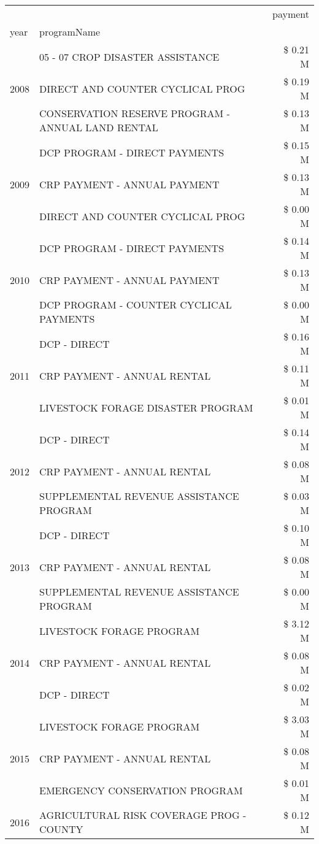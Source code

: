 \begin{tabular}{llr}
\toprule
 &  & payment \\
year & programName &  \\
\midrule
\multirow[t]{3}{*}{2008} & 05 - 07 CROP DISASTER ASSISTANCE & \$ 0.21 M \\
 & DIRECT AND COUNTER CYCLICAL PROG & \$ 0.19 M \\
 & CONSERVATION RESERVE PROGRAM - ANNUAL LAND RENTAL & \$ 0.13 M \\
\cline{1-3}
\multirow[t]{3}{*}{2009} & DCP PROGRAM - DIRECT PAYMENTS & \$ 0.15 M \\
 & CRP PAYMENT - ANNUAL PAYMENT & \$ 0.13 M \\
 & DIRECT AND COUNTER CYCLICAL PROG & \$ 0.00 M \\
\cline{1-3}
\multirow[t]{3}{*}{2010} & DCP PROGRAM - DIRECT PAYMENTS & \$ 0.14 M \\
 & CRP PAYMENT - ANNUAL PAYMENT & \$ 0.13 M \\
 & DCP PROGRAM - COUNTER CYCLICAL PAYMENTS & \$ 0.00 M \\
\cline{1-3}
\multirow[t]{3}{*}{2011} & DCP - DIRECT & \$ 0.16 M \\
 & CRP PAYMENT - ANNUAL RENTAL & \$ 0.11 M \\
 & LIVESTOCK FORAGE DISASTER PROGRAM & \$ 0.01 M \\
\cline{1-3}
\multirow[t]{3}{*}{2012} & DCP - DIRECT & \$ 0.14 M \\
 & CRP PAYMENT - ANNUAL RENTAL & \$ 0.08 M \\
 & SUPPLEMENTAL REVENUE ASSISTANCE PROGRAM & \$ 0.03 M \\
\cline{1-3}
\multirow[t]{3}{*}{2013} & DCP - DIRECT & \$ 0.10 M \\
 & CRP PAYMENT - ANNUAL RENTAL & \$ 0.08 M \\
 & SUPPLEMENTAL REVENUE ASSISTANCE PROGRAM & \$ 0.00 M \\
\cline{1-3}
\multirow[t]{3}{*}{2014} & LIVESTOCK FORAGE PROGRAM & \$ 3.12 M \\
 & CRP PAYMENT - ANNUAL RENTAL & \$ 0.08 M \\
 & DCP - DIRECT & \$ 0.02 M \\
\cline{1-3}
\multirow[t]{3}{*}{2015} & LIVESTOCK FORAGE PROGRAM & \$ 3.03 M \\
 & CRP PAYMENT - ANNUAL RENTAL & \$ 0.08 M \\
 & EMERGENCY CONSERVATION PROGRAM & \$ 0.01 M \\
\cline{1-3}
\multirow[t]{3}{*}{2016} & AGRICULTURAL RISK COVERAGE PROG - COUNTY & \$ 0.12 M \\

\end{tabular}
